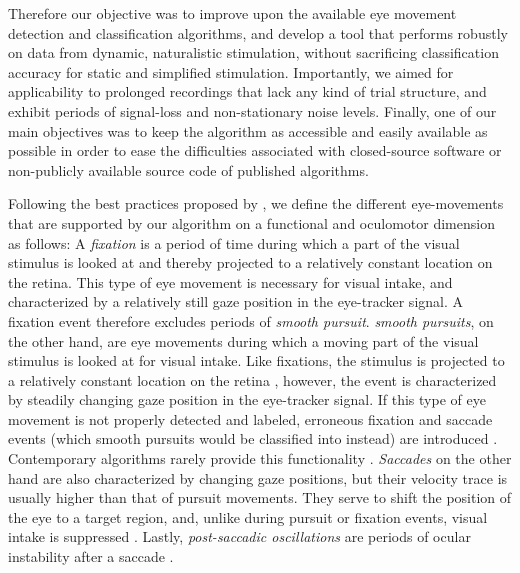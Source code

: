 Therefore our objective was to improve upon the available eye movement
detection and classification algorithms, and develop a tool that performs
robustly on data from dynamic, naturalistic stimulation, without sacrificing classification
accuracy for static and simplified stimulation. Importantly, we aimed for
applicability to prolonged recordings that lack any kind of trial structure,
and exhibit periods of signal-loss and non-stationary noise levels.
Finally, one of our main objectives was to keep the algorithm as accessible
and easily available as possible in order to ease the difficulties associated
with closed-source software or non-publicly available source code of published
algorithms.

Following the best practices proposed by \citet{hessels2018eye},
we define the different eye-movements that are supported by our algorithm
on a functional and oculomotor dimension as follows:
A \textit{fixation} is a period of time during which a part of the visual stimulus
is looked at and thereby projected to a relatively constant location on the retina.
This type of eye movement is necessary for visual intake, and characterized by a
relatively still gaze position in the eye-tracker signal.
A fixation event therefore excludes periods of \textit{smooth pursuit}.
\textit{smooth pursuits}, on the other hand, are eye movements during which a moving part of the visual stimulus is
looked at for visual intake. Like fixations, the stimulus is projected to a relatively constant
location on the retina \citep{carl1987pursuits}, however, the event is characterized by steadily changing gaze position in the eye-tracker
signal. If this type of eye movement is not properly detected and labeled,
erroneous fixation and saccade events (which smooth pursuits would be classified into
instead) are introduced \citep{Andersson2017}. Contemporary algorithms rarely provide
this functionality \cite[but see \eg][for existing algorithms with
smooth pursuit classification]{LARSSON2015145,Komogortsev2013}.
\textit{Saccades} on the other hand are also characterized by changing gaze positions,
but their velocity trace is usually higher than that of pursuit movements.
They serve to shift the position of the eye to a target region, and, unlike
during pursuit or fixation events, visual intake
is suppressed \citep{Schutz2011}. Lastly, \textit{post-saccadic oscillations} are periods of
ocular instability after a saccade \citep{Nystrom2010AnData}.

